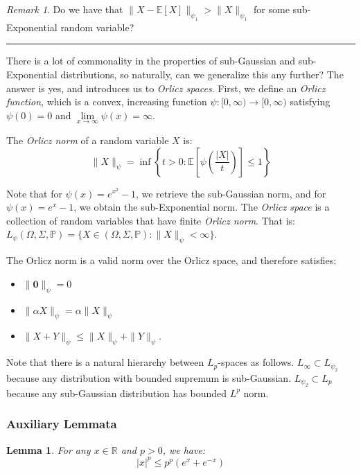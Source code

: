 \documentclass{article}
\newtheorem{lemma}{Lemma}[subsection]
\theoremstyle{remark}
\newtheorem*{remark}{Remark}
\newcommand{\comprule}{\textcolor[RGB]{220,220,220}{\rule{\linewidth}{0.2pt}}}
\newcommand{\real}{\mathbb{R}}
\newcommand{\Exp}{\mathbb{E}}
\begin{document}
\begin{remark}
Do we have that \(\|X - \Exp[X]\|_{\psi_{1}} > \|X\|_{\psi_{1}}\) for some sub-Exponential random variable?
\end{remark}

\comprule

There is a lot of commonality in the properties of sub-Gaussian and sub-Exponential distributions, so naturally, can we generalize this any further? The answer is yes, and introduces us to \emph{Orlicz spaces}. First, we define an \emph{Orlicz function}, which is a convex, increasing function \(\psi : [0, \infty) \to [0, \infty)\) satisfying \(\psi(0) = 0\) and \(\lim\limits_{x \to \infty} \psi(x) = \infty\).

The \emph{Orlicz norm} of a random variable \(X\) is:
\begin{equation*}
\|X\|_{\psi} = \inf\left\{t > 0 : \Exp\left[\psi\left(\frac{|X|}{t}\right)\right] \leq 1\right\}
\end{equation*}

Note that for \(\psi(x) = e^{x^{2}} - 1\), we retrieve the sub-Gaussian norm, and for \(\psi(x) = e^{x} - 1\), we obtain the sub-Exponential norm. The \emph{Orlicz space} is a collection of random variables that have finite \emph{Orlicz norm}. That is: \(L_{\psi}(\Omega, \Sigma, \mathbb{P}) = \{X \in (\Omega, \Sigma, \mathbb{P}) : \|X\|_{\psi} < \infty\}\).

The Orlicz norm is a valid norm over the Orlicz space, and therefore satisfies:
\begin{itemize}
\item \(\|\mathbf{0}\|_{\psi} = 0\)
\item \(\|\alpha X\|_{\psi} = \alpha \|X\|_{\psi}\)
\item \(\|X + Y\|_{\psi} \leq \|X\|_{\psi} + \|Y\|_{\psi}\).
\end{itemize}

Note that there is a natural hierarchy between \(L_{p}\)-spaces as follows. \(L_{\infty} \subset L_{\psi_{2}}\) because any distribution with bounded supremum is sub-Gaussian. \(L_{\psi_{2}} \subset L_{p}\) because any sub-Gaussian distribution has bounded \(L^{p}\) norm.

\subsubsection{Auxiliary Lemmata}
\begin{lemma}
\label{lem:power-sum-of-exp-bound}
For any \(x \in \real\) and \(p > 0\), we have:
\begin{equation*}
|x|^{p} \leq p^{p}(e^{x} + e^{-x})
\end{equation*}
\end{lemma}
\end{document}
